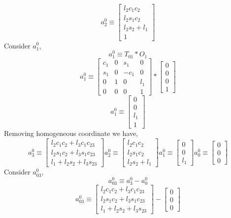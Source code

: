 \documentclass[12pt]{article}
\begin{document}
\[
  a_2^0 \equiv
  \begin{bmatrix}
    l_2c_1c_2 \\
    l_2s_1c_2 \\
    l_2s_2 + l_1 \\
    1
  \end{bmatrix}
\]
Consider $a_{1}^{0}$,
\[
  a_1^0 \equiv T_{01} * O_1
\]
\[
  a_1^0 \equiv
  \begin{bmatrix}
    c_1 & 0 & s_1 & 0 \\
    s_1 & 0 & -c_1 & 0 \\
    0 & 1 & 0 & l_1 \\
    0 & 0 & 0 & 1
  \end{bmatrix}
  *
  \begin{bmatrix}
    0 \\
    0 \\
    0 \\
    1
  \end{bmatrix}
\]
\[
  a_1^0 \equiv
  \begin{bmatrix}
    0 \\
    0 \\
    l_1 \\
    1
  \end{bmatrix}
\]
Removing homogeneous coordinate we have,
\[
  a_3^0 \equiv
  \begin{bmatrix}
    l_2c_1c_2 + l_3c_1c_{23} \\
    l_2s_1c_2 + l_3s_1c_{23} \\
    l_1 + l_2s_2 + l_3s_{23}
  \end{bmatrix}
  a_2^0 \equiv
  \begin{bmatrix}
    l_2c_1c_2 \\
    l_2s_1c_2 \\
    l_2s_2 + l_1
  \end{bmatrix}
  a_1^0 \equiv
  \begin{bmatrix}
    0 \\
    0 \\
    l_1
  \end{bmatrix}
  a_0^0 \equiv
  \begin{bmatrix}
    0 \\
    0 \\
    0
  \end{bmatrix}
\]
Consider $a_{03}^0$,
\[
  a_{03}^0 \equiv a_3^0 - a_0^0
\]
\[
  a_{03}^0 \equiv
  \begin{bmatrix}
    l_2c_1c_2 + l_3c_1c_{23} \\
    l_2s_1c_2 + l_3s_1c_{23} \\
    l_1 + l_2s_2 + l_3s_{23}
  \end{bmatrix}
  -
  \begin{bmatrix}
    0 \\
    0 \\
    0
  \end{bmatrix}
\]
\end{document}
